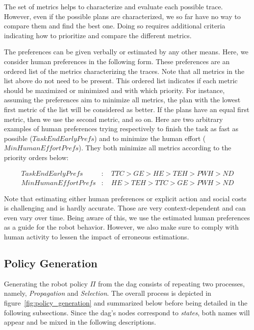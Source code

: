 The set of metrics helps to characterize and evaluate each possible trace. However, even if the possible plans are characterized, we so far have no way to compare them and find the best one. Doing so requires additional criteria indicating how to prioritize and compare the different metrics.

The preferences can be given verbally or estimated by any other means. Here, we consider human preferences in the following form. These preferences are an ordered list of the metrics characterizing the traces. Note that all metrics in the list above do not need to be present. This ordered list indicates if each metric should be maximized or minimized and with which priority. For instance, assuming the preferences aim to minimize all metrics, the plan with the lowest first metric of the list will be considered as better. If the plans have an equal first metric, then we use the second metric, and so on. Here are two arbitrary examples of human preferences trying respectively to finish the task as fast as possible ($TaskEndEarlyPrefs$) and to minimize the human effort ($MinHumanEffortPrefs$). They both minimize all metrics according to the priority orders below:

\begin{align*}
    TaskEndEarlyPrefs&: \quad TTC > GE > HE > TEH > PWH > ND \\
    MinHumanEffortPrefs&: \quad HE > TEH > TTC > GE > PWH > ND 
\end{align*}


Note that estimating either human preferences or explicit action and social costs is challenging and is hardly accurate. Those are very context-dependent and can even vary over time.
Being aware of this, we use the estimated human preferences as a guide for the robot behavior. However, we also make sure to comply with human activity to lessen the impact of erroneous estimations. 

    \subsection*{Policy Generation}

Generating the robot policy $\Pi$ from the \acrshort{dag} consists of repeating two processes, namely, \textit{Propagation} and \textit{Selection}. The overall process is depicted in figure~\ref{fig:policy_generation} and summarized below before being detailed in the following subsections. Since the \acrshort{dag}'s nodes correspond to \textit{states}, both names will appear and be mixed in the following descriptions. 

